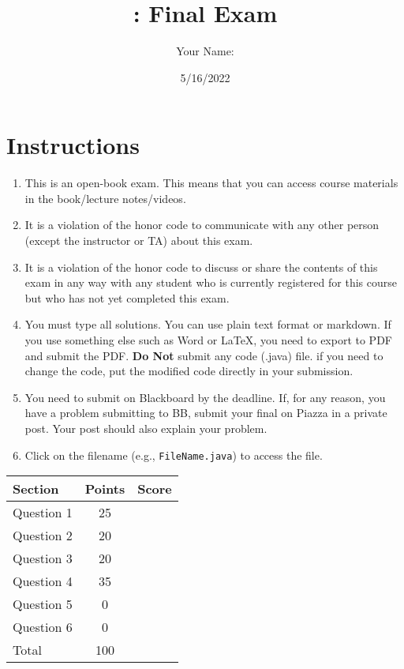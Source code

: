 \documentclass[10pt]{article}
\author{Your Name:}
\date{5/16/2022}
\title{\classname{}: Final Exam}
\begin{document}
\maketitle
\section*{Instructions}

\begin{enumerate}
\item This is an open-book exam. This means that you can access course materials in the book/lecture notes/videos.  

\item It is a violation of the honor code to communicate with any other person (except the instructor or TA) about this exam.

\item It is a violation of the honor code to discuss or share the contents of this exam in any way with any student who is currently registered for this course but who has not yet completed this exam.


\item You must type all solutions.  You can use plain text format or markdown.  If you use something else such as Word or LaTeX, you need to export to PDF and submit the PDF.  \textbf{Do Not} submit any code (.java) file.   if you need to change the code, put the modified code directly in your submission.  

\item You need to submit on Blackboard by the deadline. If, for any reason, you have a problem submitting to BB,  submit your final on Piazza in a private post.  Your post should also explain your problem.

\item Click on the filename (e.g., \texttt{FileName.java}) to access the file.
  
\end{enumerate}


\begin{center}
  \begin{tabular}{lcc}
    \toprule
    Section		&	Points	&	Score \\
    \midrule
    Question 1	&	 25	& \\
    Question 2	&	 20	& \\
    Question 3 	&	 20	& \\
    Question 4 	&	 35	& \\
    Question 5 	&	 0	& \\
    Question 6 	&	 0	& \\
    \midrule
    Total		&	100	& \\
    \bottomrule
  \end{tabular}
\end{center}
\end{document}
